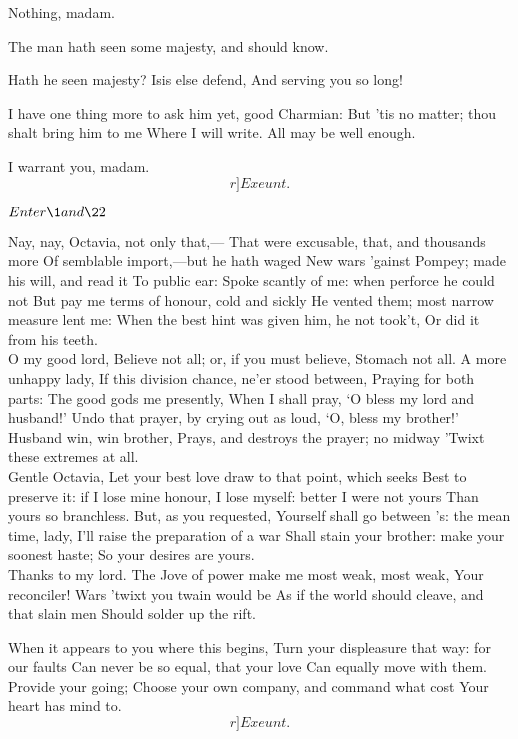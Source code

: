 \documentclass{book}
\begin{document}
\7	Nothing, madam.

\2	The man hath seen some majesty, and should know.

\7	Hath he seen majesty? Isis else defend,
	And serving you so long!

\2	I have one thing more to ask him yet, good Charmian:
	But 'tis no matter; thou shalt bring him to me
	Where I will write. All may be well enough.

\7	I warrant you, madam. \[r]Exeunt.\]




	\(Enter \1 and \22\)

\1	Nay, nay, Octavia, not only that,---
	That were excusable, that, and thousands more
	Of semblable import,---but he hath waged
	New wars 'gainst Pompey; made his will, and read it
	To public ear:
	Spoke scantly of me: when perforce he could not
	But pay me terms of honour, cold and sickly
	He vented them; most narrow measure lent me:
	When the best hint was given him, he not took't,
	Or did it from his teeth. \\

	O my good lord,
	Believe not all; or, if you must believe,
	Stomach not all. A more unhappy lady,
	If this division chance, ne'er stood between,
	Praying for both parts:
	The good gods me presently,
	When I shall pray, `O bless my lord and husband!'
	Undo that prayer, by crying out as loud,
	`O, bless my brother!' Husband win, win brother,
	Prays, and destroys the prayer; no midway
	'Twixt these extremes at all. \\

\1	Gentle Octavia,
	Let your best love draw to that point, which seeks
	Best to preserve it: if I lose mine honour,
	I lose myself: better I were not yours
	Than yours so branchless. But, as you requested,
	Yourself shall go between 's: the mean time, lady,
	I'll raise the preparation of a war
	Shall stain your brother: make your soonest haste;
	So your desires are yours. \\

	Thanks to my lord.
	The Jove of power make me most weak, most weak,
	Your reconciler! Wars 'twixt you twain would be
	As if the world should cleave, and that slain men
	Should solder up the rift.

\1	When it appears to you where this begins,
	Turn your displeasure that way: for our faults
	Can never be so equal, that your love
	Can equally move with them. Provide your going;
	Choose your own company, and command what cost
	Your heart has mind to. \[r]Exeunt.\]
\end{document}
